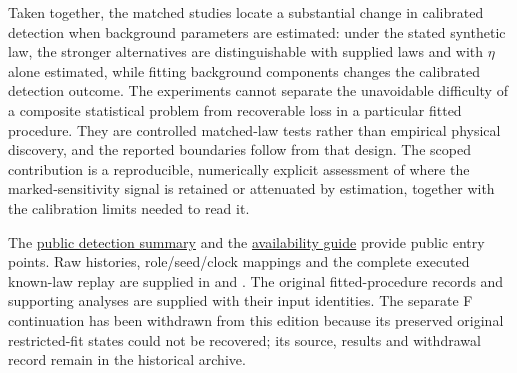 Taken together, the matched studies locate a substantial change in calibrated detection when background parameters are estimated: under the stated synthetic law, the stronger alternatives are distinguishable with supplied laws and with \(\eta\) alone estimated, while fitting background components changes the calibrated detection outcome. The experiments cannot separate the unavoidable difficulty of a composite statistical problem from recoverable loss in a particular fitted procedure. They are controlled matched-law tests rather than empirical physical discovery, and the reported boundaries follow from that design. The scoped contribution is a reproducible, numerically explicit assessment of where the marked-sensitivity signal is retained or attenuated by estimation, together with the calibration limits needed to read it. 

The \href{https://github.com/Drefetr/An_Evaluation_of_Earthquake_Models/blob/61aa599cd023f2441a6a0c6af9aa4b6fe9eda3e5/paper/data/detection.json}{public detection summary} and the \hyperref[sec:source-supplements]{availability guide} provide public entry points. Raw histories, role/seed/clock mappings and the complete executed known-law replay are supplied in  and . The original fitted-procedure records and supporting analyses are supplied with their input identities. The separate F continuation has been withdrawn from this edition because its preserved original restricted-fit states could not be recovered; its source, results and withdrawal record remain in the historical archive.
